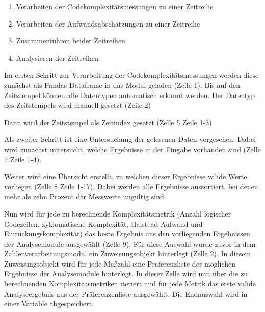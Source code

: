 \begin{enumerate}
\def\labelenumi{\arabic{enumi}.}
\item
    Verarbeiten der Codekomplexitätsmessungen zu einer Zeitreihe
\item
    Verarbeiten der Aufwandsabschätzungen zu einer Zeitreihe
\item
    Zusammenführen beider Zeitreihen
\item
    Analysieren der Zeitreihen
\end{enumerate}

Im ersten Schritt zur Verarbeitung der Codekomplexitätsmessungen werden
diese zunächst als Pandas Dataframe in das Modul geladen (Zeile 1). Bis
auf den Zeitstempel können alle Datentypen automatisch erkannt werden.
Der Datentyp des Zeitstempels wird manuell gesetzt (Zeile 2)


\lstset{style=pythonStyle}


Dann wird der Zeitstempel als Zeitindex gesetzt (Zelle 5 Zeile 1-3)

\lstset{style=pythonStyle}


Als zweiter Schritt ist eine Untersuchung der gelesenen Daten
vorgesehen. Dabei wird zunächst untersucht, welche Ergebnisse in der
Eingabe vorhanden sind (Zelle 7 Zeile 1-4).

\lstset{style=pythonStyle}


Weiter wird eine Übersicht erstellt, zu welchen dieser Ergebnisse valide
Werte vorliegen (Zelle 8 Zeile 1-17). Dabei werden alle Ergebnisse
aussortiert, bei denen mehr als zehn Prozent der Messwerte ungültig
sind.

\lstset{style=pythonStyle}


Nun wird für jede zu berechnende Komplexitätsmetrik (Anzahl logischer
Codezeilen, zyklomatische Komplexität, Halstead Aufwand und
Einrückungskomplexität) das beste Ergebnis aus den vorliegenden
Ergebnissen der Analysemodule ausgewählt (Zelle 9). Für diese Auswahl
wurde zuvor in dem Zahlenverarbeitungsmodul ein Zuweisungsobjekt
hinterlegt (Zelle 2). In diesem Zuweisungsobjekt wird für jede Ma\ss zahl
eine Präferenzliste der möglichen Ergebnisse der Analysemodule
hinterlegt. In dieser Zelle wird nun über die zu berechnenden
Komplexitätsmetriken iteriert und für jede Metrik das erste valide
Analyseergebnis aus der Präferenzenliste ausgewählt. Die Endauswahl wird
in einer Variable abgespeichert.

